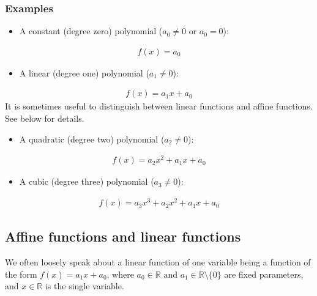 \documentclass[letterpaper,10pt,english]{jupyterBook}
\begin{document}
\subsubsection{Examples}
\label{\detokenize{03.mappings_functions_correspondences:id1}}\begin{itemize}
\item {} 
\sphinxAtStartPar
A constant (degree zero) polynomial (\(a_0 \ne 0\) or \(a_0 = 0\)):

\end{itemize}
\begin{equation*}
\begin{split}
f(x) = a_0
\end{split}
\end{equation*}\begin{itemize}
\item {} 
\sphinxAtStartPar
A linear (degree one) polynomial (\(a_1 \ne 0\)):

\end{itemize}
\begin{equation*}
\begin{split}
f(x) = a_1 x + a_0
\end{split}
\end{equation*}
\sphinxAtStartPar
It is sometimes useful to distinguish between linear functions and affine functions. See below for details.
\begin{itemize}
\item {} 
\sphinxAtStartPar
A quadratic (degree two) polynomial (\(a_2 \ne 0\)):

\end{itemize}
\begin{equation*}
\begin{split}
f(x) = a_2 x^2 + a_1 x + a_0
\end{split}
\end{equation*}\begin{itemize}
\item {} 
\sphinxAtStartPar
A cubic (degree three) polynomial (\(a_3 \ne 0\)):

\end{itemize}
\begin{equation*}
\begin{split}
f(x) = a_3 x^3 + a_2 x^2 + a_1 x + a_0
\end{split}
\end{equation*}

\subsection{Affine functions and linear functions}
\label{\detokenize{03.mappings_functions_correspondences:affine-functions-and-linear-functions}}
\sphinxAtStartPar
We often loosely speak about a linear function of one variable being a function of the form \(f(x) = a_1 x + a_0\), where \(a_0 \in \mathbb{R}\) and \(a_1 \in \mathbb{R} \setminus \{0\}\) are fixed parameters, and \(x \in \mathbb{R}\) is the single variable.
\end{document}
